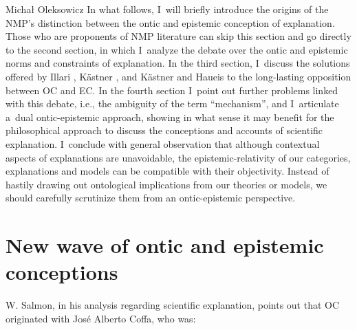 \begin{artengenv}{Michał Oleksowicz}
In what follows, I~will briefly introduce the origins of the NMP's distinction between the ontic and epistemic conception of explanation. Those who are proponents of NMP literature can skip this section and go directly to the second section, in which I~analyze the debate over the ontic and epistemic norms and constraints of explanation. In the third section, I~discuss the solutions offered by Illari
\parencite*[][]{illari_mechanistic_2013}, %
 Kästner 
\parencite*[][]{kastner_integrating_2018}, %
 and Kästner and Haueis 
\parencite*[][]{kastner_discovering_2021} %
 to the long-lasting opposition between OC and EC. In the fourth section I~point out further problems linked with this debate, i.e., the ambiguity of the term ``mechanism'', and I~articulate a~dual ontic-epistemic approach, showing in what sense it may benefit for the philosophical approach to discuss the conceptions and accounts of scientific explanation. I~conclude with general observation that although contextual aspects of explanations are unavoidable, the epistemic-relativity of our categories, explanations and models can be compatible with their objectivity. Instead of hastily drawing out ontological implications from our theories or models, we should carefully scrutinize them from an ontic-epistemic perspective.

\section{New wave of ontic and epistemic conceptions}
W. Salmon, in his analysis regarding scientific explanation, points out that OC originated with José Alberto Coffa, who was:


\end{artengenv}
